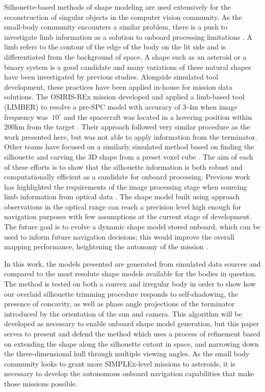 Silhouette-based methods of shape modeling are used extensively for the reconstruction of singular objects in the computer vision community\cite{Franco2009}\cite{Matusik2000}\cite{Boyer2003}. As the small-body community encounters a similar problem, there is a push to investigate limb information as a solution to onboard processing limitations \cite{Panicucci2020}\cite{Liounis}. A limb refers to the contour of the edge of the body on the lit side and is differentiated from the background of space. A shape such as an asteroid or a binary system is a good candidate and many variations of these natural shapes have been investigated by previous studies. Alongside simulated tool development, these practices have been applied in-house for mission data solutions. The OSIRIS-REx mission developed and applied a limb-based tool (LIMBER) to resolve a pre-SPC model with accuracy of 3-4m when image frequency was $~10^{\circ}$ and the spacecraft was located in a hovering position within 200km from the target \cite{Palmer2019}. Their approach followed very similar procedure as the work presented here, but was not able to apply information from the terminator. Other teams have focused on a similarly simulated method based on finding the silhouette and carving the 3D shape from a preset voxel cube \cite{Bandyonadhyay2019}. The aim of each of these efforts is to show that the silhouette information is both robust and computationally efficient as a candidate for onboard processing. Previous work has highlighted the requirements of the image processing stage when sourcing limb information from optical data \cite{Li2013}. The shape model built using approach observations in the optical range can reach a precision level high enough for navigation purposes with few assumptions at the current stage of development. The future goal is to evolve a dynamic shape model stored onboard, which can be used to inform future navigation decisions; this would improve the overall mapping performance, heightening the autonomy of the mission \cite{Pesce2018}.  


In this work, the models presented are generated from simulated data sources and compared to the most resolute shape models available for the bodies in question. The method is tested on both a convex and irregular body in order to show how our overlaid silhouette trimming procedure responds to self-shadowing, the presence of concavity, as well as phase angle projections of the terminator introduced by the orientation of the sun and camera. This algorithm will be developed as necessary to enable onboard shape model generation, but this paper serves to present and defend the method which uses a process of refinement based on extending the shape along the silhouette cutout in space, and narrowing down the three-dimensional hull through multiple viewing angles. As the small body community looks to grant more SIMPLEx-level missions to asteroids,  it is necessary to develop the autonomous onboard navigation capabilities that make those missions possible. 


